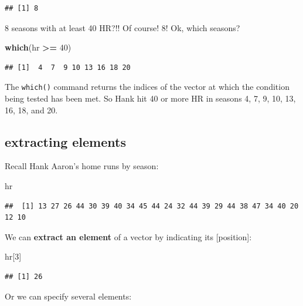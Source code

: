 \documentclass[
]{book}
\newenvironment{Shaded}{\begin{snugshade}}{\end{snugshade}}
\newcommand{\DecValTok}[1]{\textcolor[rgb]{0.00,0.00,0.81}{#1}}
\newcommand{\FunctionTok}[1]{\textcolor[rgb]{0.13,0.29,0.53}{\textbf{#1}}}
\newcommand{\NormalTok}[1]{#1}
\newcommand{\SpecialCharTok}[1]{\textcolor[rgb]{0.81,0.36,0.00}{\textbf{#1}}}
\theoremstyle{definition}
\theoremstyle{definition}
\theoremstyle{definition}
\theoremstyle{definition}
\theoremstyle{remark}
\begin{document}
\begin{verbatim}
## [1] 8
\end{verbatim}

8 seasons with at least 40 HR?!! Of course! 8! Ok, which seasons?

\begin{Shaded}
\begin{Highlighting}[]
\FunctionTok{which}\NormalTok{(hr }\SpecialCharTok{\textgreater{}=} \DecValTok{40}\NormalTok{)}
\end{Highlighting}
\end{Shaded}

\begin{verbatim}
## [1]  4  7  9 10 13 16 18 20
\end{verbatim}

The \texttt{which()} command returns the indices of the vector at which the condition being tested has been met. So Hank hit 40 or more HR in seasons 4, 7, 9, 10, 13, 16, 18, and 20.

\subsection*{extracting elements}\label{extracting-elements}

Recall Hank Aaron's home runs by season:

\begin{Shaded}
\begin{Highlighting}[]
\NormalTok{hr}
\end{Highlighting}
\end{Shaded}

\begin{verbatim}
##  [1] 13 27 26 44 30 39 40 34 45 44 24 32 44 39 29 44 38 47 34 40 20 12 10
\end{verbatim}

We can \textbf{extract an element} of a vector by indicating its {[}position{]}:

\begin{Shaded}
\begin{Highlighting}[]
\NormalTok{hr[}\DecValTok{3}\NormalTok{]}
\end{Highlighting}
\end{Shaded}

\begin{verbatim}
## [1] 26
\end{verbatim}

Or we can specify several elements:
\end{document}
